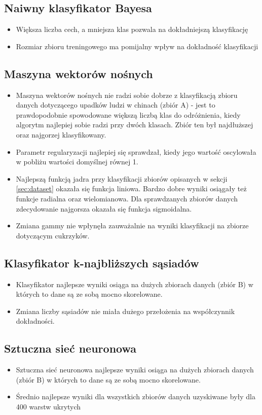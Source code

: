 \documentclass[a4paper,11pt]{article}
\begin{document}
\subsection*{Naiwny klasyfikator Bayesa}
\begin{itemize}
    \item Większa liczba cech, a mniejsza klas pozwala na dokładniejszą klasyfikację
    \item Rozmiar zbioru treningowego ma pomijalny wpływ na dokładność klasyfikacji
\end{itemize}

\subsection*{Maszyna wektorów nośnych}
\begin{itemize}
    \item Maszyna wektorów nośnych nie radzi sobie dobrze z klasyfikacją zbioru danych dotyczącego upadków ludzi w chinach (zbiór A) - jest to prawdopodobnie spowodowane większą liczbą klas do odróżnienia, kiedy algorytm najlepiej sobie radzi przy dwóch klasach. Zbiór ten był najdłuższej oraz najgorzej klasyfikowany.
    \item Parametr regularyzacji najlepiej się sprawdzał, kiedy jego wartość oscylowała w pobliżu wartości domyślnej równej 1.
    \item Najlepszą funkcją jadra przy klasyfikacji zbiorów opisanych w sekcji \ref{sec:dataset} okazała się funkcja liniowa. Bardzo dobre wyniki osiągały też funkcje radialna oraz wielomianowa. Dla sprawdzanych zbiorów danych zdecydowanie najgorsza okazała się funkcja sigmoidalna.
    \item Zmiana gammy nie wpłynęła zauważalnie na wyniki klasyfikacji na zbiorze dotyczącym cukrzyków. 
\end{itemize}

\subsection*{Klasyfikator k-najbliższych sąsiadów}
\begin{itemize}
    \item Klasyfikator najlepsze wyniki osiąga na dużych zbiorach danych (zbiór B) w których to dane są ze sobą mocno skorelowane.
    \item Zmiana liczby sąsiadów nie miała dużego przełożenia na współczynnik
    dokładności.
\end{itemize}

\subsection*{Sztuczna sieć neuronowa}
\begin{itemize}
    \item Sztuczna sieć neuronowa najlepsze wyniki osiąga na dużych zbiorach danych (zbiór B) w których to dane są ze sobą mocno skorelowane.
    \item Średnio najlepsze wyniki dla wszystkich zbiorów danych uzyskiwane były dla 400 warstw ukrytych
\end{itemize}
\end{document}
